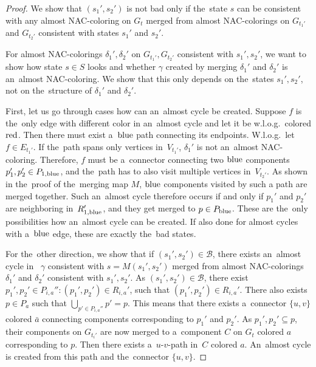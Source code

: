 \begin{proof}
	We show that \( (s_1', s_2') \) is not bad only if the~state \( s \)
	can be consistent with any almost NAC-coloring on \( G_t \)
	merged from almost NAC-colorings on \( G_{t_1'} \) and \( G_{t_2'} \)
	consistent with states \( s_1' \) and \( s_2' \).

	For almost NAC-colorings \( \delta_1', \delta_2' \) on \( G_{t_1'}, G_{t_2'} \)
	consistent with \( s_1', s_2' \),
	we want to show how state \( s \in S \) looks and
	whether \rbcol{} \( \gamma \) created by merging \( \delta_1' \) and \( \delta_2' \)
	is an~almost NAC-coloring.
	We show that this only depends on the~states \( s_1', s_2' \),
	not on the~structure of \( \delta_1' \) and \( \delta_2' \).

	First, let us go through cases how can an~almost cycle be created.
	Suppose \( f \) is the~only edge with different color
	in an~almost cycle and let it be w.l.o.g.\ colored \( \text{red} \).
	Then there must exist a~\( \text{blue} \) path connecting its endpoints.
	W.l.o.g.\ let \( f \in E_{t_1'} \).
	If the~path spans only vertices
	in~\( V_{t_1'} \), \( \delta_1' \) is not an~almost NAC-coloring.
	Therefore, \( f \) must be
	a~connector connecting two \( \text{blue} \) components \( p_1', p_2' \in P_{1,\text{blue}} \),
	and the~path has to also visit multiple vertices in~\( V_{t_2'} \).
	As shown in the~proof of the~merging map \( M \), \( \text{blue} \) components
	visited by such a path are merged together.
	Such an~almost cycle therefore occurs
	if and only if \( p_1' \) and \( p_2' \) are neighboring in~\( R_{1,\text{blue}}' \),
	and they get merged to \( p \in P_{\text{blue}} \).
	These are the~only possibilities how an~almost cycle can be created.
	If also done for almost cycles with a~\( \text{blue} \) edge,
	these are exactly the~bad states.

	For the~other direction, we show that if \( (s_1', s_2') \in \mathcal{B} \),
	there exists an~almost cycle
	in~\rbcol{} \( \gamma \) consistent with \( s = M(s_1', s_2') \)
	merged from almost NAC-colorings \( \delta_1' \) and \( \delta_2' \)
	consistent with \( s_1', s_2' \).
	As \( (s_1', s_2') \in \mathcal{B} \),
	there exist \( p_1', p_2' \in P_{i, a}'' : (p_1', p_2') \in R_{i, a}' \),
	such that \( (p_1', p_2') \in R_{i, a}' \).
	There also exists \( p \in P_{a} \) such that \( \bigcup_{p' \in P_{i, a}''} p' = p \).
	This means that there exists a~connector \( \{u, v\} \) colored \( \bar{a} \) connecting
	components corresponding to \( p_1' \) and \( p_2' \).
	As \( p_1', p_2' \subseteq p \),
	their components on \( G_{t_i'} \) are now merged
	to a~component \( C \) on \( G_t \) colored \( a \) corresponding to \( p \).
	Then there exists a~\( u \)-\( v \)-path in~\( C \) colored \( a \).
	An~almost cycle is created from this path and the~connector \( \{u, v\} \).
\end{proof}
%

